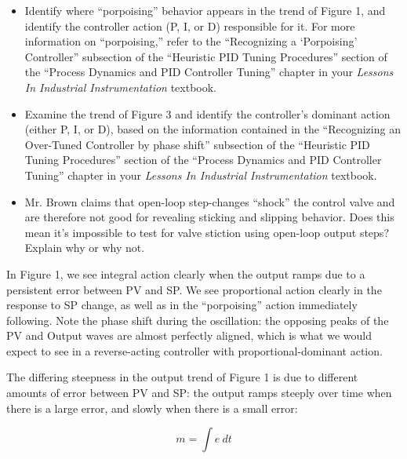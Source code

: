 \begin{itemize}
\item{} Identify where ``porpoising'' behavior appears in the trend of Figure 1, and identify the controller action (P, I, or D) responsible for it.  For more information on ``porpoising,'' refer to the ``Recognizing a `Porpoising' Controller'' subsection of the ``Heuristic PID Tuning Procedures'' section of the ``Process Dynamics and PID Controller Tuning'' chapter in your {\it Lessons In Industrial Instrumentation} textbook.
\item{} Examine the trend of Figure 3 and identify the controller's dominant action (either P, I, or D), based on the information contained in the ``Recognizing an Over-Tuned Controller by phase shift'' subsection of the ``Heuristic PID Tuning Procedures'' section of the ``Process Dynamics and PID Controller Tuning'' chapter in your {\it Lessons In Industrial Instrumentation} textbook.
\item{} Mr. Brown claims that open-loop step-changes ``shock'' the control valve and are therefore not good for revealing sticking and slipping behavior.  Does this mean it's impossible to test for valve stiction using open-loop output steps?  Explain why or why not.
\end{itemize}














In Figure 1, we see integral action clearly when the output ramps due to a persistent error between PV and SP.  We see proportional action clearly in the response to SP change, as well as in the ``porpoising'' action immediately following.  Note the phase shift during the oscillation: the opposing peaks of the PV and Output waves are almost perfectly aligned, which is what we would expect to see in a reverse-acting controller with proportional-dominant action.

\vskip 10pt

The differing steepness in the output trend of Figure 1 is due to different amounts of error between PV and SP: the output ramps steeply over time when there is a large error, and slowly when there is a small error:

$$m = \int e \> dt$$

